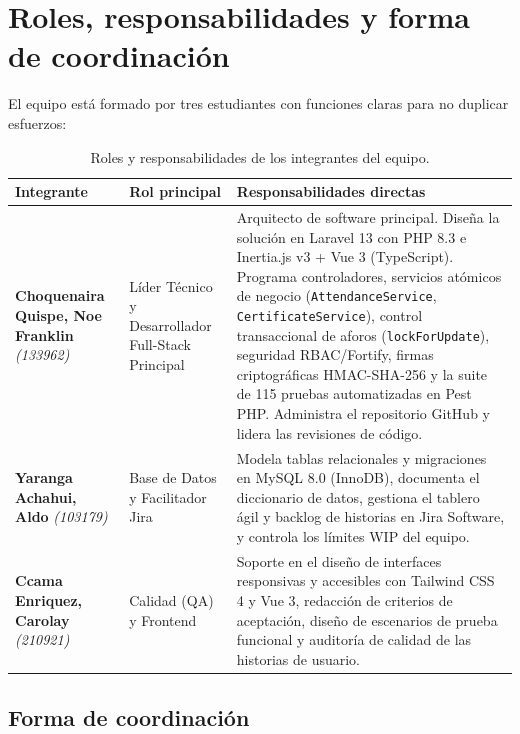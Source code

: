 \section{Roles, responsabilidades y forma de coordinación}

El equipo está formado por tres estudiantes con funciones claras para no duplicar esfuerzos:

\begin{table}[H]
\centering
\small
\begin{tabularx}{\textwidth}{P{4.2cm} P{3.8cm} Y}
\toprule
\textbf{Integrante} & \textbf{Rol principal} & \textbf{Responsabilidades directas} \\
\midrule
\textbf{Choquenaira Quispe, Noe Franklin} \newline \textit{(133962)} & Líder Técnico y Desarrollador Full-Stack Principal & Arquitecto de software principal. Diseña la solución en Laravel 13 con PHP 8.3 e Inertia.js v3 + Vue 3 (TypeScript). Programa controladores, servicios atómicos de negocio (\texttt{AttendanceService}, \texttt{CertificateService}), control transaccional de aforos (\texttt{lockForUpdate}), seguridad RBAC/Fortify, firmas criptográficas HMAC-SHA-256 y la suite de 115 pruebas automatizadas en Pest PHP. Administra el repositorio GitHub y lidera las revisiones de código. \\
\addlinespace
\textbf{Yaranga Achahui, Aldo} \newline \textit{(103179)} & Base de Datos y Facilitador Jira & Modela tablas relacionales y migraciones en MySQL 8.0 (InnoDB), documenta el diccionario de datos, gestiona el tablero ágil y backlog de historias en Jira Software, y controla los límites WIP del equipo. \\
\addlinespace
\textbf{Ccama Enriquez, Carolay} \newline \textit{(210921)} & Calidad (QA) y Frontend & Soporte en el diseño de interfaces responsivas y accesibles con Tailwind CSS 4 y Vue 3, redacción de criterios de aceptación, diseño de escenarios de prueba funcional y auditoría de calidad de las historias de usuario. \\
\bottomrule
\end{tabularx}
\caption{Roles y responsabilidades de los integrantes del equipo.}
\label{tab:roles}
\end{table}

\subsection{Forma de coordinación}

